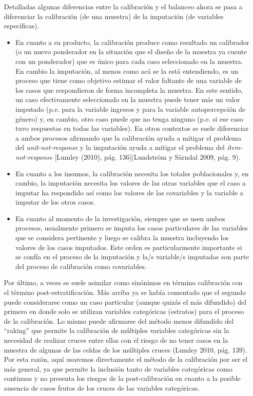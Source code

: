 \documentclass[
  spanish,
  a4paper,
]{scrreprt}
\begin{document}
Detalladas algunas diferencias entre la calibración y el balanceo ahora
se pasa a diferenciar la calibración (de una muestra) de la imputación
(de variables específicas).

\begin{itemize}
\item
  En cuanto a su producto, la calibración produce como resultado un
  calibrador (o un nuevo ponderador en la situación que el diseño de la
  muestra ya cuente con un ponderador) que es único para cada caso
  seleccionado en la muestra. En cambio la imputación, al menos como acá
  se la está entendiendo, es un proceso que tiene como objetivo estimar
  el valor faltante de una variable de los casos que respondieron de
  forma incompleta la muestra. En este sentido, un caso efectivamente
  seleccionado en la muestra puede tener más un valor imputado (p.e.
  para la variable ingresos y para la variable autopercepción de género)
  y, en cambio, otro caso puede que no tenga ninguno (p.e. si ese caso
  tuvo respuestas en todas las variables). En otros contextos se suele
  diferenciar a ambos procesos afirmando que la calibración ayuda a
  mitigar el problema del \emph{unit-not-response} y la imputación ayuda
  a mitigar el problema del \emph{ítem-not-response} {[}Lumley (2010),
  pág. 136{]}(Lundström y Särndal 2009, pág. 9).
\item
  En cuanto a los insumos, la calibración necesita los totales
  poblacionales y, en cambio, la imputación necesita los valores de las
  otras variables que el caso a imputar ha respondido así como los
  valores de las covariables y la variable a imputar de los otros casos.
\item
  En cuanto al momento de la investigación, siempre que se usen ambos
  procesos, usualmente primero se imputa los casos particulares de las
  variables que se considera pertinente y luego se calibra la muestra
  incluyendo los valores de los casos imputados. Este orden es
  particularmente importante si se confía en el proceso de la imputación
  y la/s variable/s imputadas son parte del proceso de calibración como
  covariables.
\end{itemize}

\noindent Por último, a veces se suele asimilar como sinónimos en
término calibración con el término post-estratificación. Más arriba ya
se había comentado que el segundo puede considerarse como un caso
particular (aunque quizás el más difundido) del primero en donde solo se
utilizan variables categóricas (estratos) para el proceso de la
calibración. Lo mismo puede afirmarse del método menos difundido del
``raking'' que permite la calibración de múltiples variables categóricas
sin la necesidad de realizar cruces entre ellas con el riesgo de no
tener casos en la muestra de algunas de las celdas de los múltiples
cruces (Lumley 2010, pág. 139). Por esta razón, aquí usaremos
directamente el método de la calibración por ser el más general, ya que
permite la inclusión tanto de variables categóricas como continuas y no
presenta los riesgos de la post-calibración en cuanto a la posible
ausencia de casos frutos de los cruces de las variables categóricas.
\end{document}

